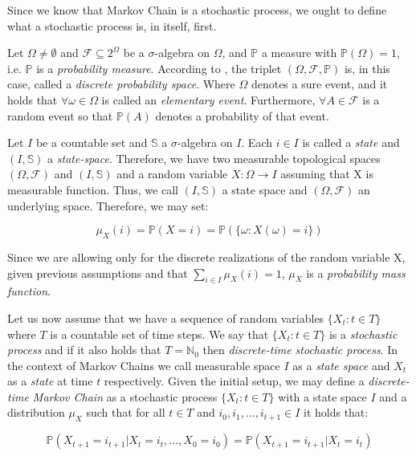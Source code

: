 Since we know that Markov Chain is a stochastic process, we ought to define what a stochastic process is, in itself, first. 

Let $\Omega \neq \emptyset$ and $\mathcal{F} \subseteq 2^{\Omega}$ be a $\sigma$-algebra on $\Omega$, and $\mathbb{P}$ a measure with $\mathbb{P}(\Omega) = 1$, i.e. $\mathbb{P}$ is a \textit{probability measure}. According to \citep{Dostal}, the triplet $(\Omega, \mathcal{F}, \mathbb{P})$ is, in this case, called a \textit{discrete probability space}. Where $\Omega$ denotes a sure event, and it holds that $\forall \omega \in \Omega$ is called an \textit{elementary event}. Furthermore, $\forall A \in \mathcal{F}$ is a random event  so that $\mathbb{P}(A)$ denotes a probability of that event. 

Let $I$ be a countable set and $\mathbb{S}$ a $\sigma$-algebra on $I$. Each $i \in I$ is called a \textit{state} and $(I,\mathbb{S})$ a \textit{state-space}.
Therefore, we have two measurable topological spaces $(\Omega,\mathcal{F})$ and $(I,\mathbb{S})$ and a random variable $X: \Omega \rightarrow I$ assuming that X is measurable function. Thus, we call $(I,\mathbb{S})$ a state space and $(\Omega, \mathcal{F})$ an underlying space. Therefore, we may set:

\begin{equation}
\mu_X(i) = \mathbb{P}(X=i)=\mathbb{P}(\{\omega: X(\omega)=i\})
\end{equation}

Since we are allowing only for the discrete realizations of the random variable X, given previous assumptions and that $\sum\limits_{i \in I} \mu_X(i)=1$, $\mu_X$ is a \textit{probability mass function}. \citep{Norris2012}

Let us now assume that we have a sequence of random variables $\{X_t : t \in T\}$ where $T$ is a countable set of time steps.
 We say that $\{X_t : t \in T\}$ is a \textit{stochastic process} and if it also holds that $T = \mathbb{N}_0$ then {\it discrete-time stochastic process}.
 In the context of Markov Chains we call measurable space $I$ as a \textit{state space} and $X_t$ as a \textit{state} at time $t$ respectively.
 Given the initial setup, we may define a \textit{discrete-time Markov Chain} as a stochastic process $\{X_t : t \in T\}$ with a state space $I$ and a distribution $\mu_X$ such that for all $t \in T$ and $i_0,i_1,\ldots,i_{t+1} \in I$ it holds that:

\begin{equation} \label{eq:DTMC}
\mathbb{P}(X_{t+1}=i_{t+1}|X_t=i_t,\ldots,X_0=i_0) = \mathbb{P}(X_{t+1}=i_{t+1}|X_t=i_t)
\end{equation}

